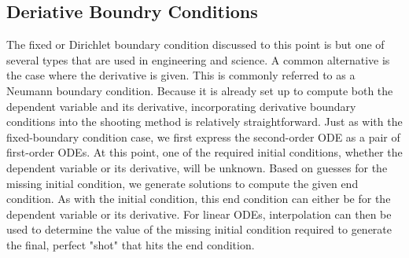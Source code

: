 \documentclass[../main.tex]{subfiles}
\begin{document}
\subsection{Deriative Boundry Conditions}

The fixed or Dirichlet boundary condition discussed to this point is but one of several types
that are used in engineering and science. A common alternative is the case where the derivative is  given. This is commonly referred to as a Neumann boundary condition.
Because it is already set up to compute both the dependent variable and its derivative,
incorporating derivative boundary conditions into the shooting method is relatively
straightforward.
Just as with the fixed-boundary condition case, we first express the second-order ODE
as a pair of first-order ODEs. At this point, one of the required initial conditions, whether
the dependent variable or its derivative, will be unknown. Based on guesses for the missing initial condition, we generate solutions to compute the given end condition. As with the
initial condition, this end condition can either be for the dependent variable or its derivative. For linear ODEs, interpolation can then be used to determine the value of the missing
initial condition required to generate the final, perfect "shot" that hits the end condition.
\end{document}
